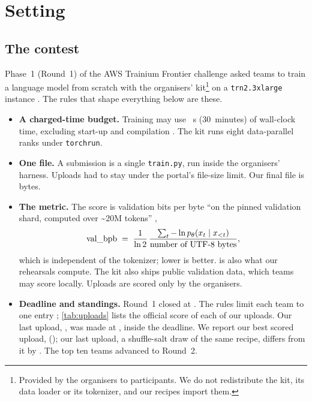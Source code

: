 \section{Setting}
\label{sec:setting}

\subsection{The contest}
\label{sec:contest}

Phase~1 (Round~1) of the AWS Trainium Frontier challenge \citep{trainiumfrontier2026rules} asked teams to train a
language model from scratch with the organisers' kit\footnote{Provided by the organisers to participants. We
do not redistribute the kit, its data loader or its tokenizer, and our recipes import them.} on a
\texttt{trn2.3xlarge} instance \citep{aws_trn2_arch,aws_trainium2_arch}. The rules that shape everything below are
these.
\begin{itemize}
  \item \textbf{A charged-time budget.} Training may use ~s (30~minutes) of wall-clock time,
    excluding start-up and compilation \citep{trainiumfrontier2026rules}. The kit runs eight data-parallel ranks
    under \texttt{torchrun}.
  \item \textbf{One file.} A submission is a single \texttt{train.py}, run inside the organisers' harness.
    Uploads had to stay under the portal's file-size limit. Our final file is  bytes.
  \item \textbf{The metric.} The score is validation bits per byte ``on the pinned validation shard, computed over
    \textasciitilde20M tokens'' \citep{trainiumfrontier2026rules},
    \begin{equation}
      \label{eq:bpb}
      \text{val\_bpb{}} \;=\; \frac{1}{\ln 2}\,\frac{\sum_{t} -\ln p_\theta(x_t \mid x_{<t})}{\text{number of UTF-8 bytes}},
    \end{equation}
    which is independent of the tokenizer; lower is better.  is also what our rehearsals compute. The kit also ships public validation
    data, which teams may score locally. Uploads are scored only by the organisers.
  \item \textbf{Deadline and standings.} Round~1 closed at . The rules limit each team to one
    entry \citep{trainiumfrontier2026rules}; \cref{tab:uploads} lists the official score of each of our uploads. Our
    last upload, , was made at , inside the deadline. We report our best scored upload,
     (); our last upload, a shuffle-salt draw of the same recipe, differs from it
    by . The top ten teams advanced to Round~2.
\end{itemize}

